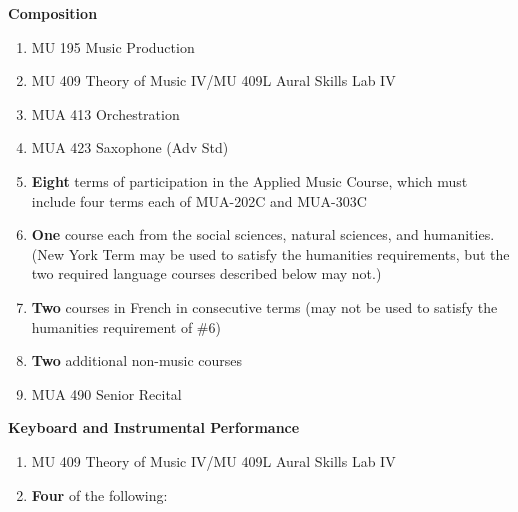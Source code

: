 \documentclass[
  letterpaper,
]{scrbook}
\providecommand{\tightlist}{%
  \setlength{\itemsep}{0pt}\setlength{\parskip}{0pt}}
\begin{document}
\begin{enumerate}
  \textbf{Composition}

  \begin{enumerate}
  \def\labelenumii{\arabic{enumii}.}
  \tightlist
  \item
    MU 195 Music Production
  \item
    MU 409 Theory of Music IV/MU 409L Aural Skills Lab IV
  \item
    MUA 413 Orchestration
  \item
    MUA 423 Saxophone (Adv Std)
  \item
    \textbf{Eight} terms of participation in the Applied Music Course,
    which must include four terms each of MUA-202C and MUA-303C
  \item
    \textbf{One} course each from the social sciences, natural sciences,
    and humanities. (New York Term may be used to satisfy the humanities
    requirements, but the two required language courses described below
    may not.)
  \item
    \textbf{Two} courses in French in consecutive terms (may not be used
    to satisfy the humanities requirement of \#6)
  \item
    \textbf{Two} additional non-music courses
  \item
    MUA 490 Senior Recital
  \end{enumerate}

  \textbf{Keyboard and Instrumental Performance}

  \begin{enumerate}
  \def\labelenumii{\arabic{enumii}.}
  \tightlist
  \item
    MU 409 Theory of Music IV/MU 409L Aural Skills Lab IV
  \item
    \textbf{Four} of the following:


\end{enumerate}
\end{enumerate}
\end{document}
